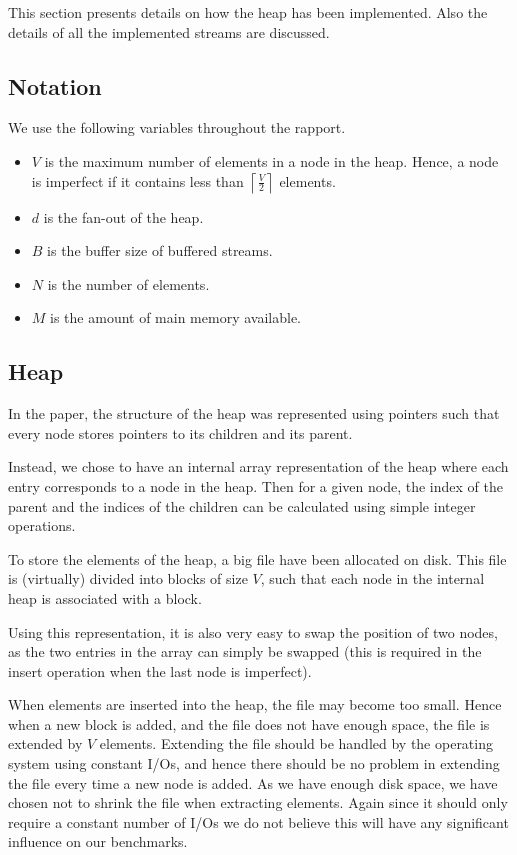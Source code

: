 This section presents details on how the heap has
been implemented. Also the details of
all the implemented streams are discussed.

\subsection{Notation}
\label{sec:implementation:parameters}

We use the following variables throughout the rapport.

\begin{itemize}
  \item $V$ is the maximum number of elements in a node in the heap. Hence, a
    node is imperfect if it contains less than $\left\lceil \frac{V}{2}
    \right\rceil$ elements.
  \item $d$ is the fan-out of the heap.
  \item $B$ is the buffer size of buffered streams.
  \item $N$ is the number of elements.
  \item $M$ is the amount of main memory available.
\end{itemize}

\subsection{Heap}
In the paper, the structure of the heap was represented using pointers
such that every node stores pointers to its children and its
parent.

Instead, we chose to have an internal array representation of the heap where
each entry corresponds to a node in the heap. Then for a given node, the
index of the parent and the indices of
the children can be calculated using simple integer operations.

To store the elements of the heap, a big file have been allocated on
disk. This file is (virtually) divided into blocks of size $V$, such
that each node in the internal heap is associated with a block.

Using this representation, it is also very easy to swap the position
of two nodes, as the two entries in the array can simply be swapped
(this is required in the insert operation when the last node is
imperfect).

When elements are inserted into the heap, the file may become too
small. Hence when a new block is added, and the file does not have
enough space, the file is extended by $V$ elements. Extending the file
should be handled by the operating system using constant I/Os, and
hence there should be no problem in extending the file every time a new
node is added. As we have enough disk space, we have chosen not to
shrink the file when extracting elements. Again since it should only
require a constant number of I/Os we do not believe this will have any
significant influence on our benchmarks.

